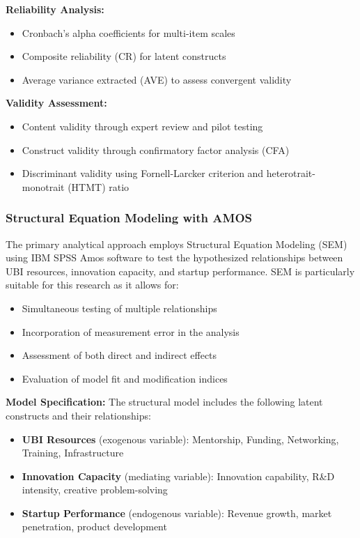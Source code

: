 \documentclass[../Main.tex]{subfiles}%
\begin{document}
	\textbf{Reliability Analysis:}
	\begin{itemize}
		\item Cronbach's alpha coefficients for multi-item scales
		\item Composite reliability (CR) for latent constructs
		\item Average variance extracted (AVE) to assess convergent validity
	\end{itemize}
	
	\textbf{Validity Assessment:}
	\begin{itemize}
		\item Content validity through expert review and pilot testing
		\item Construct validity through confirmatory factor analysis (CFA)
		\item Discriminant validity using Fornell-Larcker criterion and heterotrait-monotrait (HTMT) ratio
	\end{itemize}
	
	\subsubsection{Structural Equation Modeling with AMOS}
	The primary analytical approach employs Structural Equation Modeling (SEM) using IBM SPSS Amos software to test the hypothesized relationships between UBI resources, innovation capacity, and startup performance. SEM is particularly suitable for this research as it allows for:
	\begin{itemize}
		\item Simultaneous testing of multiple relationships
		\item Incorporation of measurement error in the analysis
		\item Assessment of both direct and indirect effects
		\item Evaluation of model fit and modification indices
	\end{itemize}
	
	\textbf{Model Specification:}
	The structural model includes the following latent constructs and their relationships:
	\begin{itemize}
		\item \textbf{UBI Resources} (exogenous variable): Mentorship, Funding, Networking, Training, Infrastructure
		\item \textbf{Innovation Capacity} (mediating variable): Innovation capability, R\&D intensity, creative problem-solving
		\item \textbf{Startup Performance} (endogenous variable): Revenue growth, market penetration, product development
	\end{itemize}
	
\end{document}
